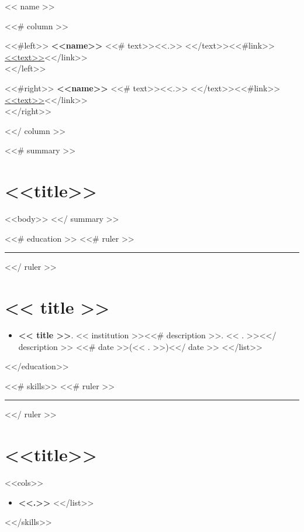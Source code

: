 \documentclass[<<fontsize>>]{article}
\def\resumeruler{\begin{center}\rule{0.5\linewidth}{0.5pt}\end{center}}
\providecommand{\tightlist}{%
  \setlength{\itemsep}{0pt}\setlength{\parskip}{0pt}}
\begin{document}
{\huge << name >>}


<<# column >>
\bigskip

\begin{minipage}[t]{0.495\textwidth}
  <<#left>>
  \textbf{<<name>>} <<# text>><<.>> <</text>><<#link>>\href{<<to>>}{<<text>>}<</link>>\\
  <</left>>
\end{minipage} %
\begin{minipage}[t]{0.495\textwidth}
  <<#right>>
  \textbf{<<name>>} <<# text>><<.>> <</text>><<#link>>\href{<<to>>}{<<text>>}<</link>>\\
  <</right>>
\end{minipage}
<</ column >>



<<# summary >>
\section{<<title>>}

<<body>>
<</ summary >>


<<# education >>
<<# ruler >>\resumeruler<</ ruler >>
\section{<< title >>}

\begin{itemize}
  \tightlist
  <<# list >>
  \item \textbf{<< title >>}. << institution >><<# description >>. << . >><</ description >> <<# date >>(<< . >>)<</ date >>
  <</list>>
\end{itemize}
<</education>>


<<# skills>>
<<# ruler >>\resumeruler<</ ruler >>
\section{<<title>>}

\begin{multicols}{<<cols>>}
  \begin{itemize}
    <<#list>>
    \item \textbf{<<.>>}
    <</list>>
  \end{itemize}
\end{multicols}
<</skills>>
\end{document}
